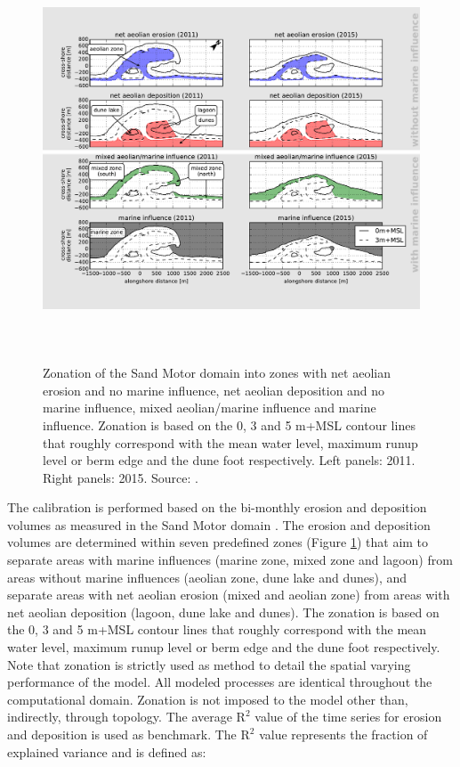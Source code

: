 \documentclass[preprint,12pt,authoryear]{elsarticle}
\begin{document}
\begin{figure}
  \centering
  \includegraphics[height=12cm, angle=90]{../Figures/decomposition}
  \caption{Zonation of the Sand Motor domain into zones with net
    aeolian erosion and no marine influence, net aeolian deposition
    and no marine influence, mixed aeolian/marine influence and marine
    influence. Zonation is based on the 0, 3 and 5 m+MSL contour lines
    that roughly correspond with the mean water level, maximum runup
    level or berm edge and the dune foot respectively. Left panels:
    2011. Right panels: 2015. Source: \citet{Hoonhout2017a}.}
  \label{fig:decomposition2}
\end{figure}

The calibration is performed based on the bi-monthly erosion and
deposition volumes as measured in the Sand Motor domain
\citep{Hoonhout2017a}. The erosion and deposition volumes are
determined within seven predefined zones (Figure
\ref{fig:decomposition2}) that aim to separate areas with marine
influences (marine zone, mixed zone and lagoon) from areas without
marine influences (aeolian zone, dune lake and dunes), and separate
areas with net aeolian erosion (mixed and aeolian zone) from areas
with net aeolian deposition (lagoon, dune lake and dunes). The
zonation is based on the 0, 3 and 5 m+MSL contour lines that roughly
correspond with the mean water level, maximum runup level or berm edge
and the dune foot respectively. Note that zonation is strictly used as
method to detail the spatial varying performance of the model. All
modeled processes are identical throughout the computational
domain. Zonation is not imposed to the model other than, indirectly,
through topology. The average $\mathrm{R^2}$ value of the time series
for erosion and deposition is used as benchmark. The $\mathrm{R^2}$
value represents the fraction of explained variance and is defined as:
\end{document}
